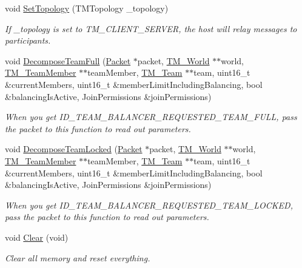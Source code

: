 \begin{DoxyCompactItemize}
void \hyperlink{class_rak_net_1_1_team_manager_a863260b06e910fc8b352e8c97b90d173}{Set\-Topology} (T\-M\-Topology \-\_\-topology)
\begin{DoxyCompactList}\small\item\em If {\itshape \-\_\-topology} is set to T\-M\-\_\-\-C\-L\-I\-E\-N\-T\-\_\-\-S\-E\-R\-V\-E\-R, the host will relay messages to participants. \end{DoxyCompactList}\item 
void \hyperlink{class_rak_net_1_1_team_manager_a47aa6ab98611642ae31e60f91ea3a4fc}{Decompose\-Team\-Full} (\hyperlink{struct_rak_net_1_1_packet}{Packet} $\ast$packet, \hyperlink{class_rak_net_1_1_t_m___world}{T\-M\-\_\-\-World} $\ast$$\ast$world, \hyperlink{class_rak_net_1_1_t_m___team_member}{T\-M\-\_\-\-Team\-Member} $\ast$$\ast$team\-Member, \hyperlink{class_rak_net_1_1_t_m___team}{T\-M\-\_\-\-Team} $\ast$$\ast$team, uint16\-\_\-t \&current\-Members, uint16\-\_\-t \&member\-Limit\-Including\-Balancing, bool \&balancing\-Is\-Active, Join\-Permissions \&join\-Permissions)
\begin{DoxyCompactList}\small\item\em When you get I\-D\-\_\-\-T\-E\-A\-M\-\_\-\-B\-A\-L\-A\-N\-C\-E\-R\-\_\-\-R\-E\-Q\-U\-E\-S\-T\-E\-D\-\_\-\-T\-E\-A\-M\-\_\-\-F\-U\-L\-L, pass the packet to this function to read out parameters. \end{DoxyCompactList}\item 
void \hyperlink{class_rak_net_1_1_team_manager_a850f25565938281baf0c1b3cba64560d}{Decompose\-Team\-Locked} (\hyperlink{struct_rak_net_1_1_packet}{Packet} $\ast$packet, \hyperlink{class_rak_net_1_1_t_m___world}{T\-M\-\_\-\-World} $\ast$$\ast$world, \hyperlink{class_rak_net_1_1_t_m___team_member}{T\-M\-\_\-\-Team\-Member} $\ast$$\ast$team\-Member, \hyperlink{class_rak_net_1_1_t_m___team}{T\-M\-\_\-\-Team} $\ast$$\ast$team, uint16\-\_\-t \&current\-Members, uint16\-\_\-t \&member\-Limit\-Including\-Balancing, bool \&balancing\-Is\-Active, Join\-Permissions \&join\-Permissions)
\begin{DoxyCompactList}\small\item\em When you get I\-D\-\_\-\-T\-E\-A\-M\-\_\-\-B\-A\-L\-A\-N\-C\-E\-R\-\_\-\-R\-E\-Q\-U\-E\-S\-T\-E\-D\-\_\-\-T\-E\-A\-M\-\_\-\-L\-O\-C\-K\-E\-D, pass the packet to this function to read out parameters. \end{DoxyCompactList}\item 
void \hyperlink{class_rak_net_1_1_team_manager_a20a0b1ba056f1c77006e32e4a493b8f3}{Clear} (void)
\begin{DoxyCompactList}\small\item\em Clear all memory and reset everything. \end{DoxyCompactList}\item 

\end{DoxyCompactItemize}
